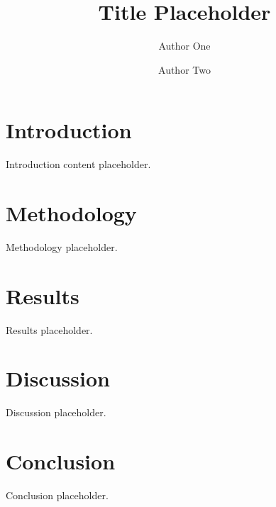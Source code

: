 \documentclass[HARVARD,LATO2COL]{WileyNJDv5}
\begin{document}
\title{Title Placeholder}
\author[1]{Author One}
\author[2]{Author Two}

\address[1]{, , }



\maketitle

\section{Introduction}
Introduction content placeholder.

\section{Methodology}
Methodology placeholder.

\section{Results}
Results placeholder.

\section{Discussion}
Discussion placeholder.

\section{Conclusion}
Conclusion placeholder.


\end{document}

